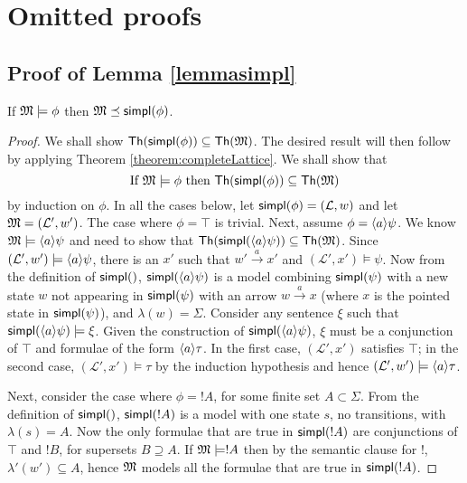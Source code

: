 \section{Omitted proofs}\label{app:completeness:proofs}\label{inc-appendix}

\subsection{Proof of Lemma \ref{lemmasimpl}}\label{app:decision:proofs}

If $\frak{M} \models \phi$ then $\frak{M} \preceq \mathsf{simpl}(\phi)$.

\begin{proof}
We shall show $\mathsf{Th}(\mathsf{simpl}(\phi)) \subseteq \mathsf{Th}(\frak{M})$.
The desired result will then follow by applying Theorem \ref{theorem:completeLattice}.
We shall show that
\[
\text{If } \frak{M} \models \phi \text{ then } \mathsf{Th}(\mathsf{simpl}(\phi)) \subseteq \mathsf{Th}(\frak{M})
\]
by induction on $\phi$.
In all the cases below, let $\mathsf{simpl}(\phi) = (\mathcal{L}, w)$ and let $\frak{M} = (\mathcal{L}', w')$.
The case where $\phi = \top$ is trivial.
Next, assume $\phi = \langle a \rangle \psi$.
We know $\frak{M} \models \langle a \rangle \psi$ and need to show that $\mathsf{Th}(\mathsf{simpl}(\langle a \rangle \psi)) \subseteq \mathsf{Th}(\frak{M})$.
Since $(\mathcal{L}', w') \models \langle a \rangle \psi$, there is an $x'$ such that $w' \xrightarrow{a} x'$ and $(\mathcal{L}', x') \models \psi$.
Now from the definition of $\mathsf{simpl}()$, $\mathsf{simpl}(\langle a \rangle \psi)$ is a model combining $\mathsf{simpl}(\psi)$ with a new state $w$ not appearing in $\mathsf{simpl}(\psi)$ with an arrow $w \xrightarrow{a} x$ (where $x$ is the pointed state in $\mathsf{simpl}(\psi)$), and $\lambda(w) = \Sigma$. 
Consider any sentence $\xi$ such that $\mathsf{simpl}(\langle a \rangle \psi) \models \xi$. Given the construction of $\mathsf{simpl}(\langle a \rangle \psi)$, $\xi$ must be a conjunction of $\top$ and formulae of the form $\langle a \rangle \tau$. In the first case, $(\mathcal{L}', x')$ satisfies $\top$; in the second case, $(\mathcal{L}', x') \models \tau$ by the induction hypothesis and hence $(\mathcal{L}', w') \models \langle a \rangle \tau$.

Next, consider the case where $\phi = !A$, for some finite set $A \subset \Sigma$.
From the definition of $\mathsf{simpl}()$, $\mathsf{simpl}(!A)$ is a model with one state $s$, no transitions, with $\lambda(s) = A$.
Now the only formulae that are true in $\mathsf{simpl}(!A)$ are conjunctions of $\top$ and $!B$, for supersets $B \supseteq A$.
If $\frak{M} \models !A$ then by the semantic clause for $!$, $\lambda'(w') \subseteq A$, hence $\frak{M}$ models all the formulae that are true in $\mathsf{simpl}(!A)$.


\end{proof}
